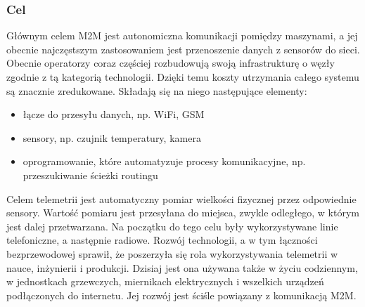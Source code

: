 \subsubsection{Cel}
Głównym celem M2M jest autonomiczna komunikacji pomiędzy maszynami, a jej obecnie najczęstszym zastosowaniem jest przenoszenie danych z sensorów do sieci. Obecnie operatorzy coraz częściej rozbudowują swoją infrastrukturę o węzły zgodnie z tą kategorią technologii. Dzięki temu koszty utrzymania całego systemu są znacznie zredukowane. Składają się na niego następujące elementy:
\begin{itemize}
  \item łącze do przesyłu danych, np. WiFi, GSM
  \item sensory, np. czujnik temperatury, kamera
  \item oprogramowanie, które automatyzuje procesy komunikacyjne, np. przeszukiwanie ścieżki routingu
\end{itemize}
Celem telemetrii jest automatyczny pomiar wielkości fizycznej przez odpowiednie sensory. Wartość pomiaru jest przesyłana do miejsca, zwykle odległego, w którym jest dalej przetwarzana. Na początku do tego celu były wykorzystywane linie telefoniczne, a następnie radiowe. Rozwój technologii, a w tym łączności bezprzewodowej sprawił, że poszerzyła się rola wykorzystywania telemetrii w nauce, inżynierii i produkcji. Dzisiaj jest ona używana także w życiu codziennym, w jednostkach grzewczych, miernikach elektrycznych i wszelkich urządzeń podłączonych do internetu. Jej rozwój jest ściśle powiązany z komunikacją M2M.\cite{m2m-web}

